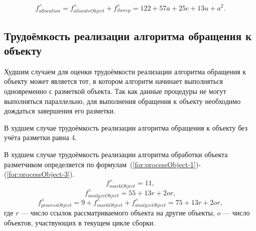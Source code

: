 \begin{equation}
	\label{for:alloc-total}
	f_{allocation}^{\wedge} = f_{allocateObject}^{\wedge} + f_{Sweep}^{\wedge} = 122 + 57a + 25c + 13u + a^2.
\end{equation}



\subsection{Трудоёмкость реализации алгоритма обращения к объекту}

Худшим случаем для оценки трудоёмкости реализации алгоритма обращения к объекту может является тот, в котором алгоритм начинает выполняться одновременно с разметкой объекта. Так как данные процедуры не могут выполняться параллельно, для выполнения обращения к объекту необходимо дождаться завершения его разметки.

В худшем случае трудоёмкость реализации алгоритма обращения к объекту без учёта разметки равна 4.

В худшем случае трудоёмкость реализации алгоритма обработки объекта разметчиком определяется по формулам~(\ref{for:processObject-1})-(\ref{for:processObject-3}).
\begin{equation}
	\label{for:processObject-1}
	f_{markObject}^{\wedge} = 11,
\end{equation}
\begin{equation}
	\label{for:processObject-2}
	f_{analyzeObject}^{\wedge} = 55 + 13r + 2or,
\end{equation}
\begin{equation}
	\label{for:processObject-3}
	f_{processObject}^{\wedge} = 9 + f_{markObject}^{\wedge} + f_{analyzeObject}^{\wedge} = 75 + 13r + 2or,
\end{equation}
где $r$ --- число ссылок рассматриваемого объекта на другие объекты, $o$ --- число объектов, участвующих в текущем цикле сборки.



